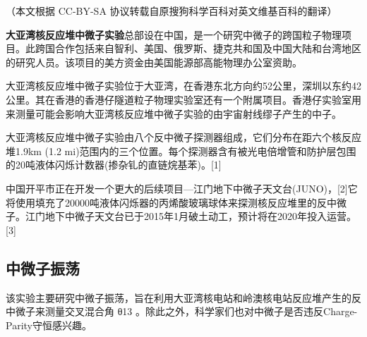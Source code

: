 
（本文根据 CC-BY-SA 协议转载自原搜狗科学百科对英文维基百科的翻译）

\textbf{大亚湾核反应堆中微子实验}总部设在中国，是一个研究中微子的跨国粒子物理项目。此跨国合作包括来自智利、美国、俄罗斯、捷克共和国及中国大陆和台湾地区的研究人员。该项目的美方资金由美国能源部高能物理办公室资助。

大亚湾核反应堆中微子实验位于大亚湾，在香港东北方向约52公里，深圳以东约42公里。其在香港的香港仔隧道粒子物理实验室还有一个附属项目。香港仔实验室用来测量可能会影响大亚湾核反应堆中微子实验的由宇宙射线缪子产生的中子。

大亚湾核反应堆中微子实验由八个反中微子探测器组成，它们分布在距六个核反应堆1.9km (1.2 mi)范围内的三个位置。每个探测器含有被光电倍增管和防护层包围的20吨液体闪烁计数器(掺杂钆的直链烷基苯)。[1]

中国开平市正在开发一个更大的后续项目—江门地下中微子天文台(JUNO)，[2]它将使用填充了20000吨液体闪烁器的丙烯酸玻璃球体来探测核反应堆里的反中微子。江门地下中微子天文台已于2015年1月破土动工，预计将在2020年投入运营。[3]

\subsection{中微子振荡}
该实验主要研究中微子振荡，旨在利用大亚湾核电站和岭澳核电站反应堆产生的反中微子来测量交叉混合角 θ13 。除此之外，科学家们也对中微子是否违反Charge-Parity守恒感兴趣。